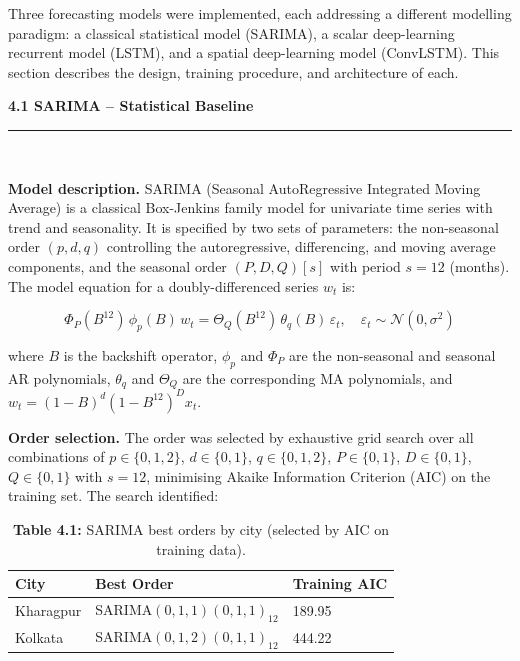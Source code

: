 \documentclass[12pt,a4paper]{report}
\begin{document}
Three forecasting models were implemented, each addressing a different modelling paradigm: a classical statistical model (SARIMA), a scalar deep-learning recurrent model (LSTM), and a spatial deep-learning model (ConvLSTM). This section describes the design, training procedure, and architecture of each.

\vspace{0.5cm}
\begin{center}
    \hypertarget{sec:s41}{}%
    {\large \textbf{4.1 SARIMA -- Statistical Baseline}}\\[0.3cm]
    \noindent\rule{\linewidth}{0.4pt}\\[0.5cm]
\end{center}

\textbf{Model description.} SARIMA (Seasonal AutoRegressive Integrated Moving Average) is a classical Box-Jenkins family model for univariate time series with trend and seasonality. It is specified by two sets of parameters: the non-seasonal order $(p, d, q)$ controlling the autoregressive, differencing, and moving average components, and the seasonal order $(P, D, Q)[s]$ with period $s = 12$ (months). The model equation for a doubly-differenced series $w_t$ is:

\begin{equation}
    \Phi_P(B^{12})\,\phi_p(B)\,w_t = \Theta_Q(B^{12})\,\theta_q(B)\,\varepsilon_t, \quad \varepsilon_t \sim \mathcal{N}(0, \sigma^2)
\end{equation}

where $B$ is the backshift operator, $\phi_p$ and $\Phi_P$ are the non-seasonal and seasonal AR polynomials, $\theta_q$ and $\Theta_Q$ are the corresponding MA polynomials, and $w_t = (1 - B)^d (1 - B^{12})^D x_t$.

\textbf{Order selection.} The order was selected by exhaustive grid search over all combinations of $p \in \{0,1,2\}$, $d \in \{0,1\}$, $q \in \{0,1,2\}$, $P \in \{0,1\}$, $D \in \{0,1\}$, $Q \in \{0,1\}$ with $s = 12$, minimising Akaike Information Criterion (AIC) on the training set. The search identified:

\begin{table}[H]
\centering
\caption*{\textbf{Table 4.1:} SARIMA best orders by city (selected by AIC on training data).}
\begin{tabular}{lll}
\toprule
\textbf{City} & \textbf{Best Order} & \textbf{Training AIC} \\
\midrule
Kharagpur & SARIMA$(0,1,1)(0,1,1)_{12}$ & 189.95 \\
Kolkata   & SARIMA$(0,1,2)(0,1,1)_{12}$ & 444.22 \\
\bottomrule
\end{tabular}
\end{table}
\end{document}
